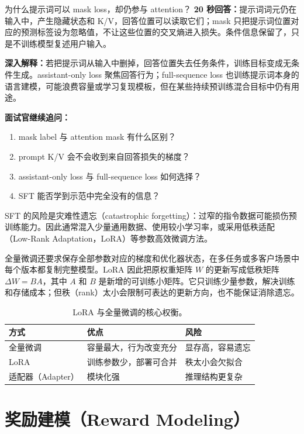 \begin{interviewbox}{为什么提示词可以 mask loss，却仍参与 attention？}
\textbf{20 秒回答：}提示词词元仍在输入中，产生隐藏状态和 K/V，回答位置可以读取它们；mask 只把提示词位置对应的预测标签设为忽略值，不让这些位置的交叉熵进入损失。条件信息保留了，只是不训练模型复述用户输入。

\textbf{深入解释：}若把提示词从输入中删掉，回答位置失去任务条件，训练目标变成无条件生成。assistant-only loss 聚焦回答行为；full-sequence loss 也训练提示词本身的语言建模，可能浪费容量或学习复现模板，但在某些持续预训练混合目标中仍有用途。

\textbf{面试官继续追问：}
\begin{enumerate}
  \item mask label 与 attention mask 有什么区别？
  \item prompt K/V 会不会收到来自回答损失的梯度？
  \item assistant-only loss 与 full-sequence loss 如何选择？
  \item SFT 能否学到示范中完全没有的信息？
\end{enumerate}
\end{interviewbox}

SFT 的风险是灾难性遗忘（catastrophic forgetting）：过窄的指令数据可能损伤预训练能力。因此通常混入少量通用数据、使用较小学习率，或采用低秩适配（Low-Rank Adaptation，LoRA）等参数高效微调方法。

全量微调还要求保存全部参数对应的梯度和优化器状态，在多任务或多客户场景中每个版本都复制完整模型。LoRA 因此把原权重矩阵 $W$ 的更新写成低秩矩阵 $\Delta W=BA$，其中 $A$ 和 $B$ 是新增的可训练小矩阵。它只训练少量参数，解决训练和存储成本；但秩（rank）太小会限制可表达的更新方向，也不能保证消除遗忘。

\begin{table}[htbp]
\centering
\small
\begin{tabularx}{0.86\textwidth}{lYY}
\toprule
方式 & 优点 & 风险\\
\midrule
全量微调 & 容量最大，行为改变充分 & 显存高，容易遗忘\\
LoRA & 训练参数少，部署可合并 & 秩太小会欠拟合\\
适配器（Adapter） & 模块化强 & 推理结构更复杂\\
\bottomrule
\end{tabularx}
\caption{LoRA 与全量微调的核心权衡。}
\end{table}

\section{奖励建模（Reward Modeling）}
\label{sec:reward-model}

